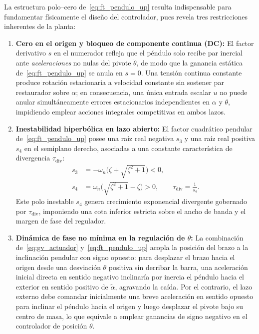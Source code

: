 La estructura polo--cero de~\eqref{eq:ft_pendulo_up} resulta indispensable para fundamentar físicamente el diseño del controlador, pues revela tres restricciones inherentes de la planta:
\begin{enumerate}
    \item \textbf{Cero en el origen y bloqueo de componente continua (DC):} El factor derivativo $s$ en el numerador refleja que el péndulo solo recibe par inercial ante \textit{aceleraciones} no nulas del pivote $\ddot{\theta}$, de modo que la ganancia estática de~\eqref{eq:ft_pendulo_up} se anula en $s=0$. Una tensión continua constante produce rotación estacionaria a velocidad constante sin sostener par restaurador sobre $\alpha$; en consecuencia, una única entrada escalar $u$ no puede anular simultáneamente errores estacionarios independientes en $\alpha$ y $\theta$, impidiendo emplear acciones integrales competitivas en ambos lazos.
    \item \textbf{Inestabilidad hiperbólica en lazo abierto:} El factor cuadrático pendular de~\eqref{eq:ft_pendulo_up} posee una raíz real negativa $s_3$ y una raíz real positiva $s_4$ en el semiplano derecho, asociadas a una constante característica de divergencia $\tau_{\text{div}}$:
    \begin{equation}
        \begin{aligned}
            s_3 &= -\omega_n\bigl(\zeta + \sqrt{\zeta^2 + 1}\bigr) < 0, \\
            s_4 &= \omega_n\bigl(\sqrt{\zeta^2 + 1} - \zeta\bigr) > 0, \qquad
            \tau_{\text{div}} = \frac{1}{s_4}.
        \end{aligned}
        \label{eq:polos_pendulo_simb}
    \end{equation}
    Este polo inestable $s_4$ genera crecimiento exponencial divergente gobernado por $\tau_{\text{div}}$, imponiendo una cota inferior estricta sobre el ancho de banda y el margen de fase del regulador.
    \item \textbf{Dinámica de fase no mínima en la regulación de $\theta$:} La combinación de~\eqref{eq:gv_actuador} y~\eqref{eq:ft_pendulo_up} acopla la posición del brazo a la inclinación pendular con signo opuesto: para desplazar el brazo hacia el origen desde una desviación $\theta$ positiva sin derribar la barra, una aceleración inicial directa en sentido negativo inclinaría por inercia el péndulo hacia el exterior en sentido positivo de $\tilde{\alpha}$, agravando la caída. Por el contrario, el lazo externo debe comandar inicialmente una breve aceleración en sentido opuesto para inclinar el péndulo hacia el origen y luego desplazar el pivote bajo su centro de masa, lo que equivale a emplear ganancias de signo negativo en el controlador de posición $\theta$.
\end{enumerate}

